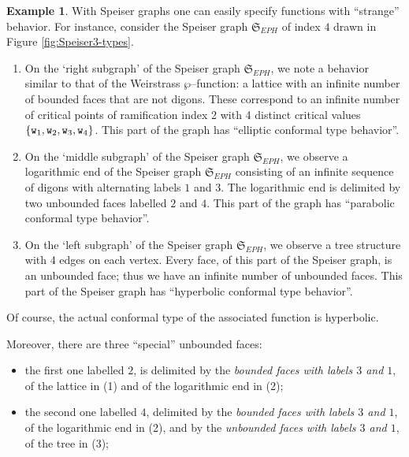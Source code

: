 \documentclass[final,3p,times]{elsarticle}
\makeatletter
\newcommand*\bigcdot{\mathpalette\bigcdot@{.5}}
\newcommand*\bigcdot@[2]{\mathbin{\vcenter{\hbox{\scalebox{#2}{$\m@th#1\bullet$}}}}}
\theoremstyle{definition}
\newtheorem{example}{Example}[section]
\makeatother
\begin{document}
\begin{example}\label{example:Speiser3-types}
With Speiser graphs one can easily specify functions with ``strange'' behavior.
For instance, consider the Speiser graph $\mathfrak{S}_{EPH}$ of index $4$ drawn in Figure \ref{fig:Speiser3-types}.
\begin{enumerate}[label=\arabic*),leftmargin=*]
\item
On the 
`right subgraph' 
of the Speiser graph $\mathfrak{S}_{EPH}$, 
we note a behavior similar to that of the Weirstrass $\wp$--function: 
a lattice 
with an infinite number of bounded faces that are not digons. 
These correspond to an infinite number of critical points of ramification index 2 with 
4 distinct critical values 
$\{ {\tt w}_{1}, {\tt w}_{2}, {\tt w}_{3}, {\tt w}_{4} \}$.
This part of the graph has ``elliptic conformal type behavior''.

\item
On the 
`middle subgraph' 
of the Speiser graph $\mathfrak{S}_{EPH}$, 
we observe a logarithmic end of the Speiser graph 
$\mathfrak{S}_{EPH}$ consisting of an infinite sequence of digons with 
alternating labels $1$ and $3$. The logarithmic end is delimited by two unbounded 
faces labelled $2$ and $4$. 
This part of the graph has ``parabolic conformal type behavior''.

\item
On the 
`left subgraph' 
of the Speiser graph $\mathfrak{S}_{EPH}$,
we observe a tree structure with 4 edges on each vertex. 
Every face, of this part of the Speiser graph, is an unbounded face;
thus we have an infinite number of unbounded faces.
This part of the Speiser graph has ``hyperbolic conformal type behavior''.
\end{enumerate}

\noindent
Of course, the actual conformal type of the associated function is hyperbolic.

\noindent
Moreover, there are three ``special'' unbounded faces: 
\begin{itemize}[label=$\bigcdot$,leftmargin=*]

\item
the first one labelled $2$, is delimited by the \emph{bounded faces 
with labels $3$ and $1$}, of the lattice in (1)
and of the logarithmic end in (2); 

\item
the second one labelled $4$, delimited by the \emph{bounded faces 
with labels $3$ and $1$}, of
the logarithmic end in (2), and by the \emph{unbounded faces 
with labels $3$ and $1$}, of the tree in (3);


\end{itemize}
\end{example}
\end{document}
